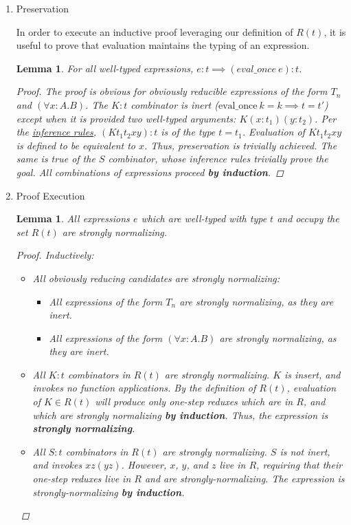 \documentclass[11pt]{article}
\newtheorem{lemma}[theorem]{Lemma}
\begin{document}
\begin{enumerate}
\item Preservation
\label{sec:org50bb3c7}

In order to execute an inductive proof leveraging our definition of \(R(t)\), it is useful to prove that evaluation maintains the typing of an expression.

\begin{lemma}
For all well-typed expressions, $e : t \implies (eval\_once\ e) : t$.
\begin{proof}
The proof is obvious for obviously reducible expressions of the form $T_{n}$ and $(\forall x:A.B)$.
The $K : t$ combinator is inert ($\text{eval\_once}\ k = k \implies t = t'$) except when it is provided two well-typed arguments: $K (x : t_{1}) (y : t_{2})$.
Per the \href{inference:1}{inference rules}, $(K t_{1} t_{2} x y) : t$ is of the type $t = t_{1}$.
Evaluation of $K t_{1} t_{2} x y$ is defined to be equivalent to $x$. Thus, preservation is trivially achieved.
The same is true of the $S$ combinator, whose inference rules trivially prove the goal. All combinations of expressions proceed \textbf{by induction}.
\end{proof}
\end{lemma}
\item Proof Execution
\label{sec:org7dceafb}

\begin{lemma}
All expressions $e$ which are well-typed with type $t$ and occupy the set $R(t)$ are strongly normalizing.
\begin{proof}
Inductively: \\
\begin{itemize}
\item All obviously reducing candidates are strongly normalizing:
\begin{itemize}
\item All expressions of the form $T_{n}$ are strongly normalizing, as they are inert.
\item All expressions of the form $(\forall x : A.B)$ are strongly normalizing, as they are inert.
\end{itemize}
\item All $K : t$ combinators in $R(t)$ are strongly normalizing. $K$ is insert, and invokes no function applications. By the definition of $R(t)$, evaluation of $K \in R(t)$ will produce only one-step reduxes which are in $R$, and which are strongly normalizing \textbf{by induction}. Thus, the expression is \textbf{strongly normalizing}.
\item All $S : t$ combinators in $R(t)$ are strongly normalizing. $S$ is not inert, and invokes $xz (yz)$. However, $x$, $y$, and $z$ live in $R$, requiring that their one-step reduxes live in $R$ and are strongly-normalizing. The expression is strongly-normalizing \textbf{by induction}.
\end{itemize}
\end{proof}
\end{lemma}


\end{enumerate}
\end{document}
